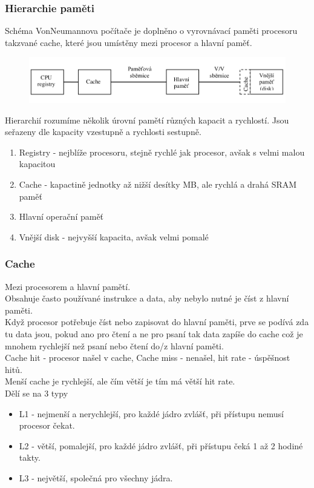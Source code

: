 \subsubsection*{Hierarchie paměti}
Schéma VonNeumannova počítače je doplněno o vyrovnávací paměti procesoru takzvané cache, které jsou umístěny mezi procesor a hlavní paměť.
\begin{figure}[h!]
    \centering
    \includegraphics[width = \textwidth]{img/Hierarchie.png}
\end{figure}
Hierarchií rozumíme několik úrovní pamětí různých kapacit a rychlostí. Jsou seřazeny dle kapacity vzestupně a rychlosti sestupně.
\begin{enumerate}
    \item Registry - nejblíže procesoru, stejně rychlé jak procesor, avšak s velmi malou kapacitou
    \item Cache - kapactině jednotky až nižší desítky MB, ale rychlá a drahá SRAM paměť
    \item Hlavní operační paměť
    \item Vnější disk - nejvyšší kapacita, avšak velmi pomalé
\end{enumerate}
\subsubsection*{Cache}
Mezi procesorem a hlavní pamětí. \\
Obsahuje často používané instrukce a data, aby nebylo nutné je číst z hlavní paměti. \\
Když procesor potřebuje číst nebo zapisovat do hlavní paměti, prve se podívá zda tu data jsou, pokud ano pro čtení a ne pro psaní tak data zapíše do cache což je mnohem rychlejší než psaní nebo čtení do/z hlavní paměti. \\
Cache hit - procesor našel v cache, Cache miss - nenašel, hit rate - úspěšnost hitů.\\
Menší cache je rychlejší, ale čím větší je tím má větší hit rate.\\
Dělí se na 3 typy
\begin{itemize}
    \item L1 - nejmenší a nerychlejší, pro každé jádro zvlášť, při přístupu nemusí procesor čekat.
    \item L2 - větší, pomalejší, pro každé jádro zvlášť, při přístupu čeká 1 až 2 hodiné takty.
    \item L3 - největší, společná pro všechny jádra.
\end{itemize}

